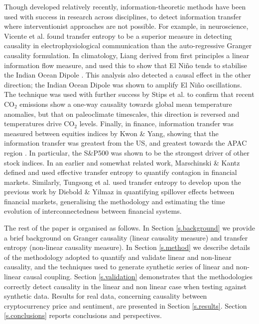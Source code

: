 \documentclass[]{rsos}%
\begin{document}
  Though developed relatively recently, information-theoretic methods have been used with success in research across disciplines, to detect information transfer where interventionist approaches are not possible. For example, in neuroscience, Vicente et al. \cite{vicente2011transfer} found transfer entropy to be a superior measure in detecting causality in electrophysiological communication than the auto-regressive Granger causality formulation. In climatology, Liang  derived from first principles a linear information flow measure, and used this to show that El Ni\~{n}o tends to stabilise the Indian Ocean Dipole \cite{san2014unraveling}. This analysis also detected a causal effect in the other direction; the Indian Ocean Dipole was shown to amplify El Ni\~{n}o oscillations. The technique was used with further success by Stips et al. \cite{stips2016causal} to confirm that recent CO$_2$ emissions show a one-way causality towards global mean temperature anomalies, but that on paleoclimate timescales, this direction is reversed and temperatures drive CO$_2$ levels. Finally, in finance, information transfer was measured between equities indices by Kwon \& Yang, showing that the information transfer was greatest from the US, and greatest towards the APAC region \cite{kwon2008information}. In particular, the S\&P500 was shown to be the strongest driver of other stock indices. In an earlier and somewhat related work, Marschinski \& Kantz   \cite{Marschinski2002} defined and used effective transfer entropy to quantify contagion in financial markets. Similarly, Tungsong et al. \cite{tungsong2018} used transfer entropy to develop upon the previous work by Diebold \& Yilmaz \cite{diebold2009measuring} in quantifying spillover effects between financial markets, generalising the methodology and estimating the time evolution of interconnectedness between financial systems.

 The rest of the paper is organised as follows. In Section \ref{s.background} we provide a brief background on Granger causality (linear causality measure) and transfer entropy (non-linear causality measure).  In Section \ref{s.method} we describe details of the methodology adopted to quantify and validate linear and non-linear causality, and the techniques used to generate synthetic series of linear and non-linear causal coupling. Section \ref{s.validation} demonstrates that the methodologies correctly detect causality  in the linear and non linear case when testing against synthetic data. Results for real data, concerning causality between cryptocurrency price and sentiment, are presented in Section \ref{s.results}. Section \ref{s.conclusions} reports conclusions and perspectives.
\end{document}
